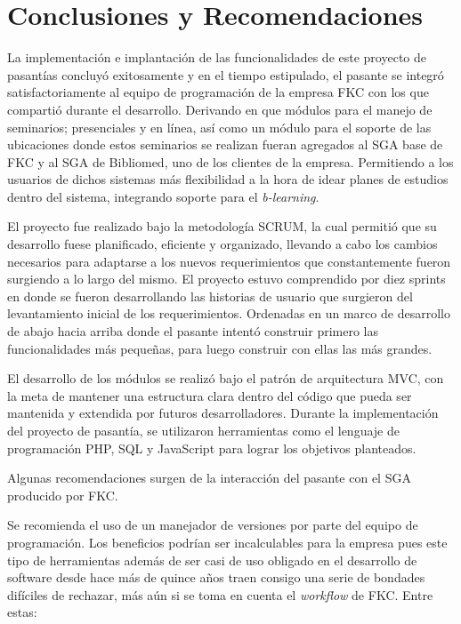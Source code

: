 \chapter*{Conclusiones y Recomendaciones}
\thispagestyle{empty} %
 

La implementación e implantación de las funcionalidades de este proyecto de pasantías concluyó exitosamente y en el tiempo estipulado, el pasante se integró satisfactoriamente al equipo de programación de la empresa FKC con los que compartió durante el desarrollo. Derivando en que módulos para el manejo de seminarios; presenciales y en línea, así como un módulo para el soporte de las ubicaciones donde estos seminarios se realizan fueran agregados al SGA base de FKC y al SGA de Bibliomed, uno de los clientes de la empresa. Permitiendo a los usuarios de dichos sistemas más flexibilidad a la hora de idear planes de estudios dentro del sistema, integrando soporte para el \emph{b-learning}.

El proyecto fue realizado bajo la metodología SCRUM, la cual permitió que su desarrollo fuese planificado, eficiente y organizado, llevando a cabo los cambios necesarios para adaptarse a los nuevos requerimientos que constantemente fueron surgiendo a lo largo del mismo. El proyecto estuvo comprendido por diez sprints en donde se fueron desarrollando las historias de usuario que surgieron del levantamiento inicial de los requerimientos. Ordenadas en un marco de desarrollo de abajo hacia arriba donde el pasante intentó construir primero las funcionalidades más pequeñas, para luego construir con ellas las más grandes.

El desarrollo de los módulos se realizó bajo el patrón de arquitectura MVC, con la meta de mantener una estructura clara dentro del código que pueda ser mantenida y extendida por futuros desarrolladores. Durante la implementación del proyecto de pasantía, se utilizaron herramientas como el lenguaje de programación PHP, SQL y JavaScript para lograr los objetivos planteados.

Algunas recomendaciones surgen de la interacción del pasante con el SGA producido por FKC.

Se recomienda el uso de un manejador de versiones por parte del equipo de programación. Los beneficios podrían ser incalculables para la empresa pues este tipo de herramientas además de ser casi de uso obligado en el desarrollo de software desde hace más de quince años traen consigo una serie de bondades difíciles de rechazar, más aún si se toma en cuenta el \emph{workflow} de FKC. Entre estas:

